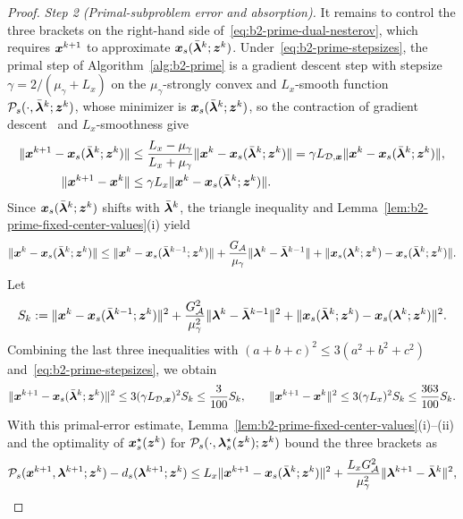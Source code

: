 \begin{proof}
\emph{Step 2 (Primal-subproblem error and absorption).} It remains to control
the three brackets on the right-hand side of~\eqref{eq:b2-prime-dual-nesterov},
which requires \(\bm{x}^{k+1}\) to approximate \(\bm{x}_s(\bar{\bm{\lambda}}^k;\bm{z}^k)\). Under~\eqref{eq:b2-prime-stepsizes},
the primal step of Algorithm~\ref{alg:b2-prime} is a gradient descent step
with stepsize \(\gamma=2/(\mu_\gamma+L_x)\) on the \(\mu_\gamma\)-strongly
convex and \(L_x\)-smooth function
\(\mathcal P_s(\cdot,\bar{\bm{\lambda}}^k;\bm{z}^k)\), whose minimizer is
\(\bm{x}_s(\bar{\bm{\lambda}}^k;\bm{z}^k)\), so the contraction of gradient
descent~\cite{nesterov2018lectures} and \(L_x\)-smoothness give
\begin{align*}
    \|\bm{x}^{k+1}-\bm{x}_s(\bar{\bm{\lambda}}^k;\bm{z}^k)\|
    &\le\frac{L_x-\mu_\gamma}{L_x+\mu_\gamma}
    \|\bm{x}^k-\bm{x}_s(\bar{\bm{\lambda}}^k;\bm{z}^k)\|
    =\gamma L_{\mathcal{D},\bm{x}}\|\bm{x}^k-\bm{x}_s(\bar{\bm{\lambda}}^k;\bm{z}^k)\|,\\
    \|\bm{x}^{k+1}-\bm{x}^k\|
    &\le\gamma L_x\|\bm{x}^k-\bm{x}_s(\bar{\bm{\lambda}}^k;\bm{z}^k)\|.
\end{align*}
Since \(\bm{x}_s(\bar{\bm{\lambda}}^k;\bm{z}^k)\) shifts with \(\bar{\bm{\lambda}}^k\), the triangle
inequality and Lemma~\ref{lem:b2-prime-fixed-center-values}(i) yield
\[
    \|\bm{x}^k-\bm{x}_s(\bar{\bm{\lambda}}^k;\bm{z}^k)\|
    \le\|\bm{x}^k-\bm{x}_s(\bar{\bm{\lambda}}^{k-1};\bm{z}^k)\|
    +\frac{G_{\mathcal{A}}}{\mu_\gamma}\|\bm{\lambda}^k-\bar{\bm{\lambda}}^{k-1}\|
    +\|\bm{x}_s(\bm{\lambda}^k;\bm{z}^k)-\bm{x}_s(\bar{\bm{\lambda}}^k;\bm{z}^k)\|.
\]
Let
\[
    S_k:=\|\bm{x}^k-\bm{x}_s(\bar{\bm{\lambda}}^{k-1};\bm{z}^k)\|^2
    +\frac{G_{\mathcal{A}}^2}{\mu_\gamma^2}\|\bm{\lambda}^k-\bar{\bm{\lambda}}^{k-1}\|^2
    +\|\bm{x}_s(\bar{\bm{\lambda}}^k;\bm{z}^k)-\bm{x}_s(\bm{\lambda}^k;\bm{z}^k)\|^2 .
\]
Combining the last three inequalities with
\((a+b+c)^2\le3(a^2+b^2+c^2)\) and~\eqref{eq:b2-prime-stepsizes}, we obtain
\begin{equation}
\label{eq:b2-prime-tracking}
    \|\bm{x}^{k+1}-\bm{x}_s(\bar{\bm{\lambda}}^k;\bm{z}^k)\|^2
    \le3(\gamma L_{\mathcal{D},\bm{x}})^2S_k\le\frac{3}{100}S_k,
    \qquad
    \|\bm{x}^{k+1}-\bm{x}^k\|^2
    \le3(\gamma L_x)^2S_k\le\frac{363}{100}S_k .
\end{equation}
With this primal-error estimate, Lemma~\ref{lem:b2-prime-fixed-center-values}(i)--(ii)
and the optimality of \(\bm{x}_s^\star(\bm{z}^k)\) for
\(\mathcal P_s(\cdot,\bm{\lambda}_s^\star(\bm{z}^k);\bm{z}^k)\) bound the three brackets as
\begin{align*}
    \mathcal P_s(\bx^{k+1},\blmbd^{k+1};\bz^k)-d_s(\blmbd^{k+1};\bz^k)
    &\le L_x\|\bx^{k+1}-\bx_s(\bar{\blmbd}^k;\bz^k)\|^2
    +\frac{L_xG_{\calA}^2}{\mu_\gamma^2}\|\blmbd^{k+1}-\bar{\blmbd}^k\|^2,\\

\end{align*}
\end{proof}
